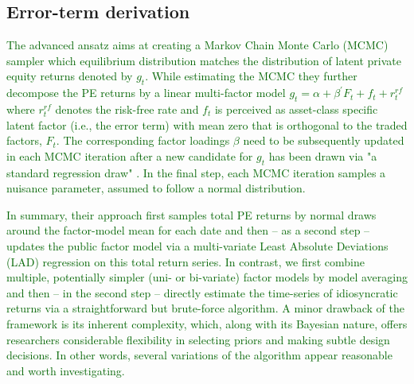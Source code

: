\subsection{Error-term derivation}

\textcolor{darkgreen}{
	The advanced \cite{ACGP18} ansatz aims at creating a Markov Chain Monte Carlo (MCMC) sampler which equilibrium distribution matches the distribution of latent private equity returns denoted by $g_t$.
	While estimating the MCMC they further decompose the PE returns by a linear multi-factor model $g_t = \alpha + \beta^{'} F_t + f_t + r_t^{rf}$ where $ r_t^{rf}$ denotes the risk-free rate and $f_t$ is perceived as asset-class specific latent factor (i.e., the error term) with mean zero that is orthogonal to the traded factors, $F_t$.
	The corresponding factor loadings $\beta$ need to be subsequently updated in each MCMC iteration after a new candidate for $g_t$ has been drawn via "a standard regression draw" \cite[internet appendix, p.4]{ACGP18}.
	In the final step, each MCMC iteration samples a nuisance parameter, assumed to follow a normal distribution. 
}

\textcolor{darkgreen}{
	In summary, their approach first samples total PE returns by normal draws around the factor-model mean for each date and then -- as a second step -- updates the public factor model via a multi-variate Least Absolute Deviations (LAD) regression on this total return series.
	In contrast, we first combine multiple, potentially simpler (uni- or bi-variate) factor models by model averaging and then -- in the second step -- directly estimate the time-series of idiosyncratic returns via a straightforward but brute-force algorithm.
	A minor drawback of the \cite{ACGP18} framework is its inherent complexity, which, along with its Bayesian nature, offers researchers considerable flexibility in selecting priors and making subtle design decisions.
	In other words, several variations of the \cite{ACGP18} algorithm appear reasonable and worth investigating.
}